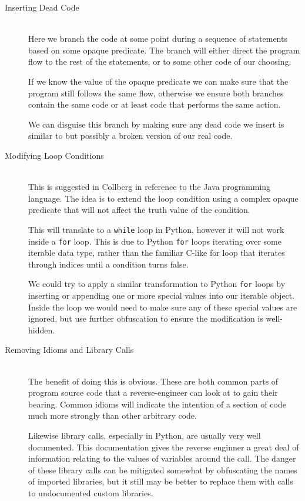 \documentclass[twoside,a4paper]{report}
\begin{document}
\begin{description}
\item[Inserting Dead Code] \hfill \\
Here we branch the code at some point during a sequence of statements based on some opaque predicate. The branch will either
direct the program flow to the rest of the statements, or to some other code of our choosing.

If we know the value of the opaque predicate we can make sure that the program still follows the same flow, otherwise we
ensure both branches contain the same code or at least code that performs the same action.

We can disguise this branch by making sure any dead code we insert is similar to but possibly a broken version of our real code.

\item[Modifying Loop Conditions] \hfill \\
This is suggested in Collberg in reference to the Java programming language. The idea is to extend the loop condition using a
complex opaque predicate that will not affect the truth value of the condition.

This will translate to a \texttt{while} loop in Python, however it will not work inside a \texttt{for} loop. This is due to
Python \texttt{for} loops iterating over some iterable data type, rather than the familiar C-like for loop that iterates
through indices until a condition turns false.

We could try to apply a similar transformation to Python \texttt{for} loops by inserting or appending one or more special values
into our iterable object. Inside the loop we would need to make sure any of these special values are ignored, but use further
obfuscation to ensure the modification is well-hidden.

\item[Removing Idioms and Library Calls] \hfill \\
The benefit of doing this is obvious. These are both common parts of program source code that a reverse-engineer can look at
to gain their bearing. Common idioms will indicate the intention of a section of code much more strongly than other arbitrary
code.

Likewise library calls, especially in Python, are usually very well documented. This documentation gives the reverse enginner
a great deal of information relating to the values of variables around the call. The danger of these library calls can be
mitigated somewhat by obfuscating the names of imported libraries, but it still may be better to replace them with calls
to undocumented custom libraries.


\end{description}
\end{document}
